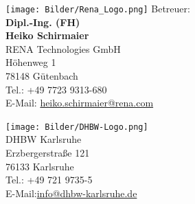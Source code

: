 \documentclass[
   ngerman          %
  ,a4paper          %
 ,12pt
]{article} %
\begin{document}
\begin{titlepage}
\begin{small}
\begin{minipage}[b]{0.4\textwidth}	%
\begin{flushleft}					%
\texttt{[image: Bilder/Rena\_Logo.png]}						%
Betreuer:\\
\textbf{Dipl.-Ing. (FH) \\Heiko Schirmaier}\\
RENA Technologies GmbH\\
Höhenweg 1\\
78148 Gütenbach\\
Tel.: +49 7723 9313-680 \\
E-Mail: \href{mailto:heiko.schirmaier@rena.com}{heiko.schirmaier@rena.com}
\end{flushleft}						%
\end{minipage}						%
\hspace{\fill}
\begin{minipage}[b]{0.4\textwidth}	%
\begin{flushright}				%
\texttt{[image: Bilder/DHBW-Logo.png]}						%
\newline
\ \\
DHBW Karlsruhe\\
Erzbergerstraße 121\\
76133 Karlsruhe\\
Tel.: +49 721 9735-5 \\
E-Mail:\href{mailto:info@dhbw-karlsruhe.de}{info@dhbw-karlsruhe.de}
\end{flushright}					%
\end{minipage}						%
\end{small}				
\end{titlepage}
\end{document}
